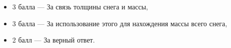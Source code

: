 \begin{itemize}
	\item{3 балла} --- За связь толщины снега и массы,
	\item{3 балла} --- За использование этого для нахождения массы всего снега,
	\item{2 балл} --- За верный ответ.
\end{itemize}